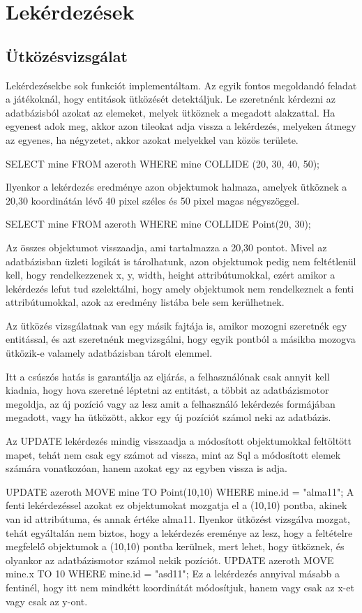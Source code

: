 \section{Lekérdezések}

\subsection{Ütközésvizsgálat}

Lekérdezésekbe sok funkciót implementáltam. Az egyik fontos megoldandó feladat a játékoknál, hogy entitások ütközését detektáljuk. 
Le szeretnénk kérdezni az adatbázisból azokat az elemeket, melyek ütköznek a megadott alakzattal. Ha egyenest adok meg, akkor azon tileokat adja vissza a lekérdezés, melyeken átmegy az egyenes, ha négyzetet, akkor azokat melyekkel van közös területe.

SELECT mine
FROM azeroth
WHERE mine COLLIDE (20, 30, 40, 50);

Ilyenkor a lekérdezés eredménye azon objektumok halmaza, amelyek ütköznek a 20,30 koordinátán lévő 40 pixel széles és 50 pixel magas négyszöggel.

SELECT mine
FROM azeroth
WHERE mine COLLIDE Point(20, 30);

Az összes objektumot visszaadja, ami tartalmazza a 20,30 pontot. 
Mivel az adatbázisban üzleti logikát is tárolhatunk, azon objektumok pedig nem feltétlenül kell, hogy rendelkezzenek x, y, width, height attribútumokkal, ezért amikor a lekérdezés lefut tud szelektálni, hogy amely objektumok nem rendelkeznek a fenti attribútumokkal, azok az eredmény listába bele sem kerülhetnek.


Az ütközés vizsgálatnak van egy másik fajtája is, amikor mozogni szeretnék egy entitással, és azt szeretnénk megvizsgálni, hogy egyik pontból a másikba mozogva ütközik-e valamely adatbázisban tárolt elemmel.

Itt a csúszós hatás is garantálja az eljárás, a felhasználónak csak annyit kell kiadnia, hogy hova szeretné léptetni az entitást, a többit az adatbázismotor megoldja, az új pozíció vagy az lesz amit a felhasználó lekérdezés formájában megadott, vagy ha ütközött, akkor egy új pozíciót számol neki az adatbázis.

Az UPDATE lekérdezés mindig visszaadja a módosított objektumokkal feltöltött mapet, tehát nem csak egy számot ad vissza, mint az Sql a módosított elemek számára vonatkozóan, hanem azokat egy az egyben vissza is adja.

UPDATE azeroth MOVE  mine TO Point(10,10) WHERE mine.id = "alma11"; 
A fenti lekérdezéssel azokat ez objektumokat mozgatja el a (10,10) pontba, akinek van id attribútuma, és annak értéke alma11. Ilyenkor ütközést vizsgálva mozgat, tehát egyáltalán nem biztos, hogy a lekérdezés ereménye az lesz, hogy a feltételre megfelelő objektumok a (10,10) pontba kerülnek, mert lehet, hogy ütköznek, és olyankor az adatbázismotor számol nekik pozíciót.
UPDATE azeroth MOVE  mine.x TO 10 WHERE mine.id = "asd11"; 
Ez a lekérdezés annyival másabb a fentinél, hogy itt nem mindkétt koordinátát módosítjuk, hanem vagy csak az x-et vagy csak az y-ont.

